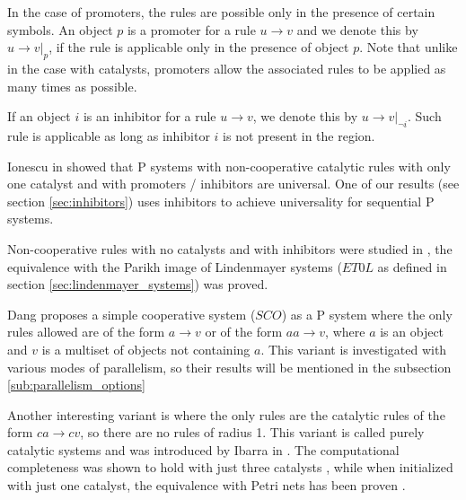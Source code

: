 
In the case of promoters, the rules are possible only in the presence of certain symbols. An object $p$ is a promoter for a rule $u\rightarrow v$ and we denote this by $u\rightarrow v|_{p}$, if the rule is applicable only in the presence of object $p$. Note that unlike in the case with catalysts, promoters allow the associated rules to be applied as many times as possible.


If an object $i$ is an inhibitor for a rule $u\rightarrow v$, we denote this by $u\rightarrow v|_{\neg i}$. Such rule is applicable as long as inhibitor $i$ is not present in the region.


Ionescu in \cite{Ionescu:jucs_10_5:on_p_systems_with} showed that P systems with non-cooperative catalytic rules with only one catalyst and with promoters / inhibitors are universal.
One of our results (see section \ref{sec:inhibitors}) uses inhibitors to achieve universality for sequential P systems.


Non-cooperative rules with no catalysts and with inhibitors were studied in \cite{Sburlan:2006:FurtherResultsPromotersInhibitors}, the equivalence with the Parikh image of Lindenmayer systems ($ET0L$ as defined in section \ref{sec:lindenmayer_systems}) was proved.


Dang \cite{Ibarra04dang} proposes a simple cooperative system ($SCO$) as a P system where the only rules allowed are of the form $a\rightarrow v$ or of the form $aa\rightarrow v$, where $a$ is an object and $v$ is a multiset of objects not containing $a$. This variant is investigated with various modes of parallelism, so their results will be mentioned in the subsection \ref{sub:parallelism_options}


Another interesting variant is where the only rules are the catalytic rules of the form $ca\rightarrow cv$, so there are no rules of radius 1. This variant is called purely catalytic systems and was introduced by Ibarra in \cite{Ibarra:03:Catalytic}. The computational completeness was shown to hold with just three catalysts \cite{Freund2005TwoCatalysts}, while when initialized with just one catalyst, the equivalence with Petri nets has been proven \cite{Ibarra04Catalytic}.

